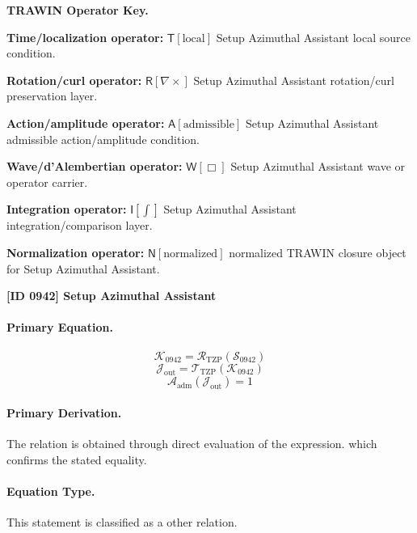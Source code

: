 \par\vspace{0.45\baselineskip}
\noindent\begin{minipage}[t]{\linewidth}
\begingroup
\small
\raggedright
\textbf{TRAWIN Operator Key.}\par
\noindent\textbf{Time/localization operator:} $\mathsf{T}\!\left[\mathrm{local}\right]$ Setup Azimuthal Assistant local source condition.\par
\noindent\textbf{Rotation/curl operator:} $\mathsf{R}\!\left[\nabla\times\right]$ Setup Azimuthal Assistant rotation/curl preservation layer.\par
\noindent\textbf{Action/amplitude operator:} $\mathsf{A}\!\left[\mathrm{admissible}\right]$ Setup Azimuthal Assistant admissible action/amplitude condition.\par
\noindent\textbf{Wave/d'Alembertian operator:} $\mathsf{W}\!\left[\Box\right]$ Setup Azimuthal Assistant wave or operator carrier.\par
\noindent\textbf{Integration operator:} $\mathsf{I}\!\left[\int\right]$ Setup Azimuthal Assistant integration/comparison layer.\par
\noindent\textbf{Normalization operator:} $\mathsf{N}\!\left[\mathrm{normalized}\right]$ normalized TRAWIN closure object for Setup Azimuthal Assistant.\par
\endgroup
\end{minipage}

\clearpage
\noindent\textbf{[ID 0942] Setup Azimuthal Assistant}\par
\vspace{0.35em}
\paragraph{Primary Equation.}
\[
\mathcal{K}_{0942}=\mathcal{R}_{\mathrm{TZP}}\!\left(\mathcal{S}_{0942}\right)
\]
\[
\mathcal{J}_{\mathrm{out}}=\mathcal{T}_{\mathrm{TZP}}\!\left(\mathcal{K}_{0942}\right)
\]
\[
\mathcal{A}_{\mathrm{adm}}\!\left(\mathcal{J}_{\mathrm{out}}\right)=1
\]

\paragraph{Primary Derivation.}
The relation is obtained through direct evaluation of the expression. which confirms the stated equality.
\paragraph{Equation Type.}
This statement is classified as a other relation.

